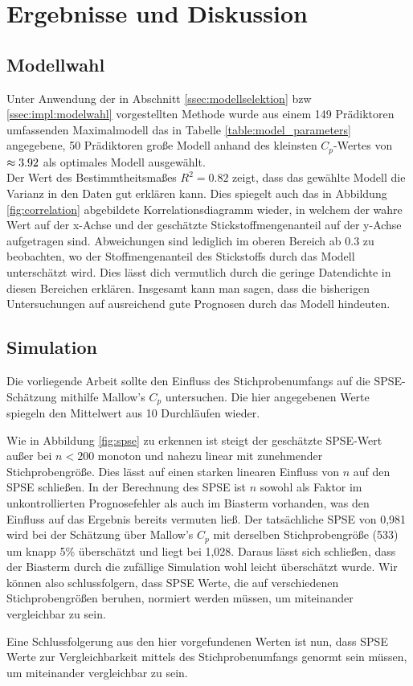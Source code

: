 \section{Ergebnisse und Diskussion}
\label{sec:discuss}

\subsection{Modellwahl}
\label{ssec:discuss:modelselect}
Unter Anwendung der in Abschnitt \ref{ssec:modellselektion} bzw \ref{ssec:impl:modelwahl} vorgestellten Methode wurde aus einem 149 Prädiktoren umfassenden Maximalmodell das in Tabelle \ref{table:model_parameters} angegebene, 50 Prädiktoren große Modell anhand des kleinsten $C_p$-Wertes von $\mathrm{\approx3.92}$ als optimales Modell ausgewählt.\\

Der Wert des Bestimmtheitsmaßes $R^2 = 0.82$ zeigt, dass das gewählte Modell die Varianz in den Daten gut erklären kann. Dies spiegelt auch das in Abbildung \ref{fig:correlation} abgebildete Korrelationsdiagramm wieder, in welchem der wahre Wert auf der x-Achse und der geschätzte Stickstoffmengenanteil auf der y-Achse aufgetragen sind.
Abweichungen sind lediglich im oberen Bereich ab $0.3$ zu beobachten, wo der Stoffmengenanteil des Stickstoffs durch das Modell unterschätzt wird.
Dies lässt dich vermutlich durch die geringe Datendichte in diesen Bereichen erklären.
Insgesamt kann man sagen, dass die bisherigen Untersuchungen auf ausreichend gute Prognosen durch das Modell hindeuten.



\subsection{Simulation}
\label{ssec:discuss:simulation}
Die vorliegende Arbeit sollte den Einfluss des Stichprobenumfangs auf die SPSE-Schätzung mithilfe Mallow's $C_p$ untersuchen. Die hier angegebenen Werte spiegeln den Mittelwert aus 10 Durchläufen wieder.



Wie in Abbildung \ref{fig:spse} zu erkennen ist steigt der geschätzte SPSE-Wert außer bei $n < 200$ monoton und nahezu linear mit zunehmender Stichprobengröße. Dies lässt auf einen starken linearen Einfluss von $n$ auf den SPSE schließen. In der Berechnung des SPSE ist $n$ sowohl als Faktor im unkontrollierten Prognosefehler als auch im Biasterm vorhanden, was den Einfluss auf das Ergebnis bereits vermuten ließ.
Der tatsächliche SPSE von 0,981 wird bei der Schätzung über Mallow's $C_p$ mit derselben Stichprobengröße (533) um knapp 5\% überschätzt und liegt bei 1,028. 
Daraus lässt sich schließen, dass der Biasterm durch die zufällige Simulation wohl leicht überschätzt wurde.
Wir können also schlussfolgern, dass SPSE Werte, die auf verschiedenen Stichprobengrößen beruhen, normiert werden müssen, um miteinander vergleichbar zu sein.

Eine Schlussfolgerung aus den hier vorgefundenen Werten ist nun, dass SPSE Werte zur Vergleichbarkeit mittels des Stichprobenumfangs genormt sein müssen, um miteinander vergleichbar zu sein.